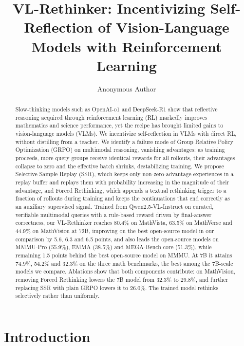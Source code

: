 \documentclass{article}
\title{VL-Rethinker: Incentivizing Self-Reflection of Vision-Language Models with Reinforcement Learning}
\author{Anonymous Author}
\begin{document}
\maketitle

\begin{abstract}
Slow-thinking models such as OpenAI-o1 and DeepSeek-R1 show that reflective reasoning acquired through reinforcement learning (RL) markedly improves mathematics and science performance, yet the recipe has brought limited gains to vision-language models (VLMs). We incentivize self-reflection in VLMs with direct RL, without distilling from a teacher. We identify a failure mode of Group Relative Policy Optimization (GRPO) on multimodal reasoning, vanishing advantages: as training proceeds, more query groups receive identical rewards for all rollouts, their advantages collapse to zero and the effective batch shrinks, destabilizing training. We propose Selective Sample Replay (SSR), which keeps only non-zero-advantage experiences in a replay buffer and replays them with probability increasing in the magnitude of their advantage, and Forced Rethinking, which appends a textual rethinking trigger to a fraction of rollouts during training and keeps the continuations that end correctly as an auxiliary supervised signal. Trained from Qwen2.5-VL-Instruct on curated, verifiable multimodal queries with a rule-based reward driven by final-answer correctness, our VL-Rethinker reaches 80.4\% on MathVista, 63.5\% on MathVerse and 44.9\% on MathVision at 72B, improving on the best open-source model in our comparison by 5.6, 6.3 and 6.5 points, and also leads the open-source models on MMMU-Pro (55.9\%), EMMA (38.5\%) and MEGA-Bench core (51.3\%), while remaining 1.5 points behind the best open-source model on MMMU. At 7B it attains 74.9\%, 54.2\% and 32.3\% on the three math benchmarks, the best among the 7B-scale models we compare. Ablations show that both components contribute: on MathVision, removing Forced Rethinking lowers the 7B model from 32.3\% to 29.8\%, and further replacing SSR with plain GRPO lowers it to 26.0\%. The trained model rethinks selectively rather than uniformly.
\end{abstract}

\section{Introduction}
\label{sec:intro}
\end{document}
